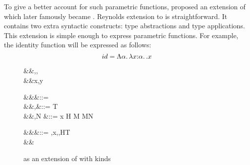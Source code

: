 \documentclass[manuscript,screen,nonacm]{acmart}
\begin{document}
To give a better account for such parametric functions, \citet{reynolds_towards_1974} proposed an extension of \STLC which later famously became \SF. Reynolds extension to \STLC is straightforward. It contains two extra syntactic constructs: type abstractions and type applications. This extension is simple enough to express parametric functions. For example, the identity function will be expressed as follows:
$$
id = \Lambda \alpha.\, \lambda x{:}\alpha.\, . x
$$
\begin{figure}[ht]
  \centering
  \begin{syntax}
     &&\alpha,\beta,\gamma \\
     &&x,y          \\
  \end{syntax}
  \begin{syntax}
         &&\kappa       &::= \star \bnfor \kappa \to \kappa\\
         &&\tau,\sigma  &::= \alpha \bnfor T \bnfor \tau \to \tau \bnfor \tau\App\tau \bnfor \syntaxhl{\Forall {\alpha\co\kappa} \tau}\\
         &&\Tm,N          &::= x \bnfor  H \bnfor {} M \bnfor M\App N \bnfor {}\\
  \end{syntax}
  \begin{syntax}
     &&\TEnv &::= \empt \bnfor \TEnv,x\co\tau \bnfor \TEnv,\alpha\co\kappa \bnfor \TEnv,H\co T\\
      &&\Subst
  \end{syntax}
  \caption{\SF as an extension of \STLC with kinds}
  \label{fig:system-f-syntax}
\end{figure}

\newcommand\KVar{
  \ib{\irule[\trule{k-var}]
    {\alpha\co\kappa \in \TEnv};
    {\Kinding \TEnv \alpha \kappa}}
}

\newcommand\KVarCo{
  \ib{\irule[\trule{co-var}]
    {c \co \sigma\sim\tau \in \TEnv};
    {\Kinding \TEnv c \sigma\sim\tau}}
}


\newcommand\KConst{
  \ib{\irule[\trule{k-const}]
    {T\co\kappa \in \TEnv};
    {\Kinding \TEnv T \kappa}}
}

\newcommand\KTApp{
  \ib{\irule[\trule{k-tapp}]
    {\Kinding \TEnv {\tau_1} {\kappa_1 \to \kappa}}
    {\Kinding \TEnv {\tau_2} {\kappa_1}};
    {\Kinding \TEnv {\tau_1\App \tau_2} \kappa}}
}
\end{document}
